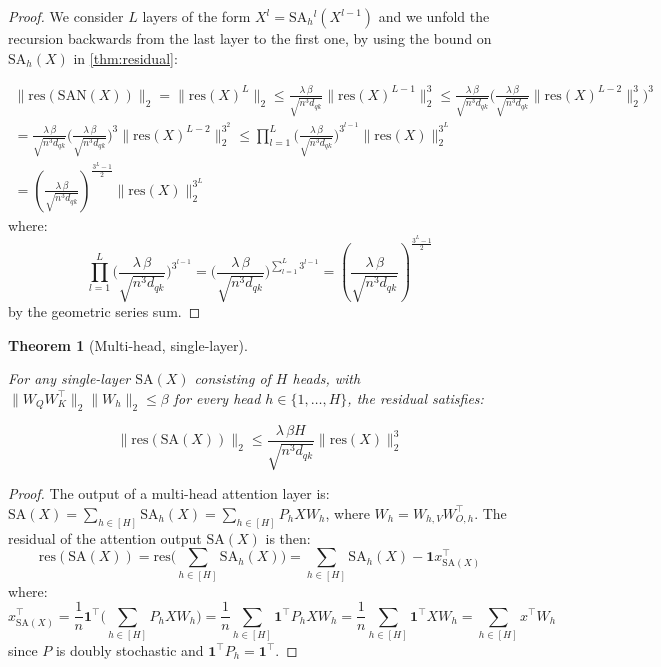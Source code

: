 \documentclass{article}
\theoremstyle{definition}
\theoremstyle{plain}
\newtheorem{theorem}{Theorem}
\begin{document}
\begin{appendices}
\begin{proof}

We consider $L$ layers of the form $X^{l} = \mathrm{SA}{_h}^{l}\!\left(X^{l-1}\right)$ and we unfold the recursion backwards from the last layer to the first one, by using the bound on $\mathrm{SA}{_h}(X)$ in \cref{thm:residual}:

\begin{align}
\|\mathrm{res}(\mathrm{SAN}(X))\|_2 = \|\mathrm{res}(X)^{L}\|_2 \le 
\frac{\lambda\,\beta}{\sqrt{n^{3}d_{qk}}}\|\mathrm{res}(X)^{L-1}\|_2^3 
\le \frac{\lambda\,\beta}{\sqrt{n^{3}d_{qk}}} \biggl(\frac{\lambda\,\beta}{\sqrt{n^{3}d_{qk}}} \|\mathrm{res}(X)^{L-2}\|_2^3\biggr)^3\\
= \frac{\lambda\,\beta}{\sqrt{n^{3}d_{qk}}} \biggl(\frac{\lambda\,\beta}{\sqrt{n^{3}d_{qk}}}\biggr)^3\|\mathrm{res}(X)^{L-2}\|_2^{3^2}
\le \prod_{l=1}^{L} \biggl(\frac{\lambda\,\beta}{\sqrt{n^{3}d_{qk}}}\biggr)^{3^{l-1}} \|\mathrm{res}(X)\|_2^{3^L}\\
= \left(
\frac{\lambda\, \beta}{\sqrt{n^{3}d_{qk}}}
\right)^{\frac{3^L-1}{2}}
\|\mathrm{res}(X)\|_2^{3^L}
\end{align}
where:
\[
\prod_{l=1}^{L} \biggl(\frac{\lambda\,\beta}{\sqrt{n^{3}d_{qk}}}\biggr)^{3^{l-1}} = \biggl(\frac{\lambda\,\beta}{\sqrt{n^{3}d_{qk}}}\biggr)^{\sum_{l=1}^L 3^{l-1}}=
\left(
\frac{\lambda\, \beta}{\sqrt{n^{3}d_{qk}}}
\right)^{\frac{3^L-1}{2}}
\]
by the geometric series sum. 
\end{proof}

\begin{theorem}[Multi-head, single-layer]
\label{thm:residual_multihead}

For any single-layer $\mathrm{SA}(X)$ consisting of $H$ heads, with $\|W_Q W_K^\top\|_2\|W_h\|_2 \le \beta$ for every head $h \in \{1,\dots,H\}$, the residual satisfies:

\[
\boxed{
\|\mathrm{res}(\mathrm{SA}(X))\|_2
\le
\frac{\lambda\,\beta H}{\sqrt{n^{3}d_{qk}}}
\|\mathrm{res}(X)\|_2^3 
}
\]

\end{theorem}

\begin{proof}

The output of a multi-head attention layer is: $\mathrm{SA}(X) = \sum_{h \in [H]} \mathrm{SA}_h(X) = \sum_{h \in [H]} P_h X W_h$, where $W_h = W_{h,V} W_{O,h}^\top$.
The residual of the attention output $\mathrm{SA}(X)$ is then:
\[
\mathrm{res}(\mathrm{SA}(X)) = \mathrm{res}\bigl(\sum_{h \in [H]} \mathrm{SA}_h(X)\bigr) = \sum_{h \in [H]} \mathrm{SA}_h(X) - 
\mathbf{1} x^\top_{\mathrm{SA}(X)}
\]
where:
\[
x^\top_{\mathrm{SA}(X)}
=
\frac{1}{n}\mathbf{1}^\top \bigl(\sum_{h \in [H]} P_h X W_h\bigr) = \frac{1}{n}\sum_{h \in [H]} \mathbf{1}^\top P_h X W_h=
\frac{1}{n}\sum_{h \in [H]} \mathbf{1}^\top X W_h=\sum_{h \in [H]}x^\top W_h
\]
since $P$ is doubly stochastic and $\mathbf{1}^\top P_h = \mathbf{1}^\top$. 


\end{proof}
\end{appendices}
\end{document}
